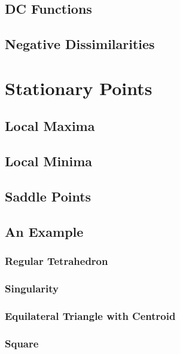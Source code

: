 \documentclass[
  12pt,
]{book}
\begin{document}
\subsection{DC Functions}\label{propdc}

\subsection{Negative Dissimilarities}\label{propnegdis}

\section{Stationary Points}\label{propstationary}

\subsection{Local Maxima}\label{local-maxima}

\subsection{Local Minima}\label{proplocmin}

\subsection{Saddle Points}\label{propsaddle}

\subsection{An Example}\label{an-example}

\subsubsection{Regular Tetrahedron}\label{regular-tetrahedron}

\subsubsection{Singularity}\label{singularity}

\subsubsection{Equilateral Triangle with Centroid}\label{equilateral-triangle-with-centroid}

\subsubsection{Square}\label{square}
\end{document}
